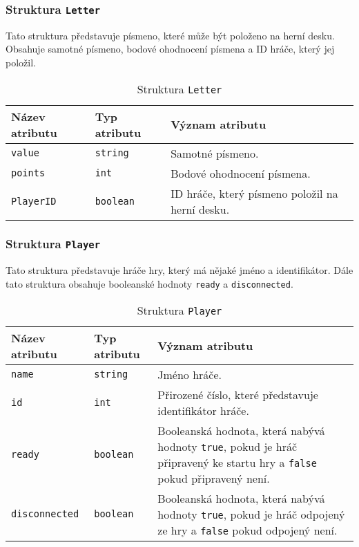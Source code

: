 \documentclass[12pt, a4paper]{article}
\begin{document}
\subsubsection{Struktura \texttt{Letter}}
Tato struktura představuje písmeno, které může být položeno na herní desku. Obsahuje samotné písmeno, bodové ohodnocení písmena a ID hráče, který jej položil.
\begin{center}
		\begin{table}[!ht]
		     \caption{Struktura \texttt{Letter}}
		\begin{tabularx}{\textwidth}{|l|l|X|}
			\hline
			\textbf{Název atributu} & \textbf{Typ atributu} & \textbf{Význam atributu} \\ 
			\hline
			\texttt{value}          &\texttt{string}&Samotné písmeno. \\
			\hline
  			\texttt{points}          &\texttt{int}&Bodové ohodnocení písmena.\\
			\hline
			\texttt{PlayerID}          &\texttt{boolean}&ID hráče, který písmeno položil na herní desku.\\
			\hline
		\end{tabularx}
		\end{table}
\end{center}  


\subsubsection{Struktura \texttt{Player}}
Tato struktura představuje hráče hry, který má nějaké jméno a identifikátor. Dále tato struktura obsahuje booleanské hodnoty \texttt{ready} a \texttt{disconnected}.
\begin{center}
		\begin{table}[!ht]
		     \caption{Struktura \texttt{Player}}
		\begin{tabularx}{\textwidth}{|l|l|X|}
			\hline
			\textbf{Název atributu} & \textbf{Typ atributu} & \textbf{Význam atributu} \\ 
			\hline
			\texttt{name}          &\texttt{string}&Jméno hráče. \\
			\hline
  			\texttt{id}          &\texttt{int}&Přirozené číslo, které představuje identifikátor hráče.\\
			\hline
			\texttt{ready}          &\texttt{boolean}&Booleanská hodnota, která nabývá hodnoty \texttt{true}, pokud je hráč připravený ke startu hry a \texttt{false} pokud připravený není.\\
			\hline
			\texttt{disconnected}          &\texttt{boolean}&Booleanská hodnota, která nabývá hodnoty \texttt{true}, pokud je hráč odpojený ze hry a \texttt{false} pokud odpojený není.\\
			\hline
		\end{tabularx}
		\end{table}
\end{center}  
\end{document}
